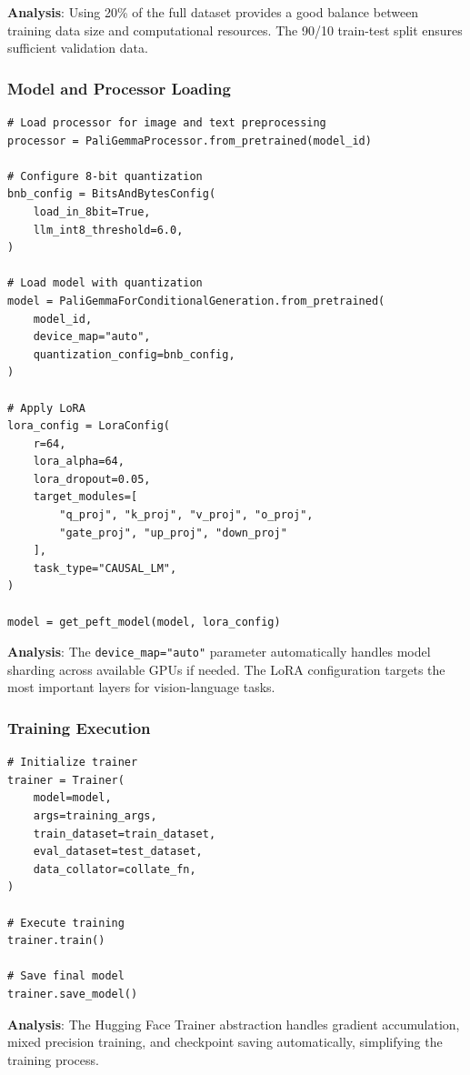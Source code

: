 \documentclass[conference]{IEEEtran}
\begin{document}
\textbf{Analysis}: Using 20\% of the full dataset provides a good balance between training data size and computational resources. The 90/10 train-test split ensures sufficient validation data.

\subsubsection{Model and Processor Loading}

\begin{lstlisting}[caption={Complete Model Loading Pipeline}]
# Load processor for image and text preprocessing
processor = PaliGemmaProcessor.from_pretrained(model_id)

# Configure 8-bit quantization
bnb_config = BitsAndBytesConfig(
    load_in_8bit=True,
    llm_int8_threshold=6.0,
)

# Load model with quantization
model = PaliGemmaForConditionalGeneration.from_pretrained(
    model_id,
    device_map="auto",
    quantization_config=bnb_config,
)

# Apply LoRA
lora_config = LoraConfig(
    r=64,
    lora_alpha=64,
    lora_dropout=0.05,
    target_modules=[
        "q_proj", "k_proj", "v_proj", "o_proj",
        "gate_proj", "up_proj", "down_proj"
    ],
    task_type="CAUSAL_LM",
)

model = get_peft_model(model, lora_config)
\end{lstlisting}

\textbf{Analysis}: The \texttt{device\_map="auto"} parameter automatically handles model sharding across available GPUs if needed. The LoRA configuration targets the most important layers for vision-language tasks.

\subsubsection{Training Execution}

\begin{lstlisting}[caption={Trainer Setup and Training}]
# Initialize trainer
trainer = Trainer(
    model=model,
    args=training_args,
    train_dataset=train_dataset,
    eval_dataset=test_dataset,
    data_collator=collate_fn,
)

# Execute training
trainer.train()

# Save final model
trainer.save_model()
\end{lstlisting}

\textbf{Analysis}: The Hugging Face Trainer abstraction handles gradient accumulation, mixed precision training, and checkpoint saving automatically, simplifying the training process.
\end{document}
